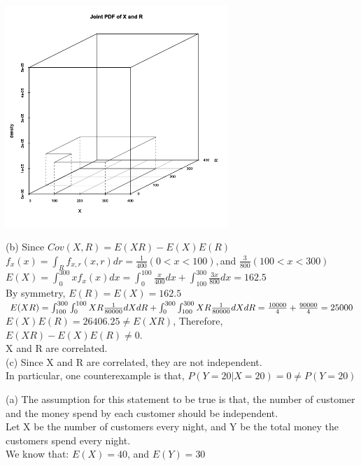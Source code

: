 \documentclass[11pt]{article}
\newenvironment{question}[2][Question]{\begin{trivlist}
\item[\hskip \labelsep {\bfseries #1}\hskip \labelsep {\bfseries #2.}]}{\end{trivlist}}
\begin{document}
 \begin{center}
 \includegraphics[height = 3.30in]{Q2_a}
 \end{center}
 
  (b) Since $Cov(X,R) = E(XR) - E(X)E(R)$\\
  $f_x(x) =\int_{R} f_{x,r}(x,r)dr = \frac{1}{400} (0<x<100), $and $  \frac{3}{800} (100<x<300)$\\
  $E(X) = \int_{0}^{300} xf_x(x)dx = \int_{0}^{100} \frac{x}{400}dx +\int_{100}^{300} \frac{3x}{800}dx = 162.5$\\
  By symmetry, $E(R) = E(X)  = 162.5$\\
  $E(XR) =\int_{100}^{300} \int_{0}^{100} XR  \frac{1}{80000}dXdR +\int_{0}^{300} \int_{100}^{300} XR  \frac{1}{80000}dXdR\\
   = \frac{10000}{4} + \frac{90000}{4} = 25000$\\
  $ E(X)E(R) =26406.25 \neq E(XR)$, Therefore, $E(XR) - E(X)E(R) \neq 0$.\\ X and R are correlated.\\
    
  
  (c) Since X and R are correlated, they are not independent. \\
  In particular, one counterexample is that, $P(Y = 20|X = 20) = 0 \neq P(Y = 20)$\\
  
  \begin{question}{3}
  	\end{question}
  (a) The assumption for this statement to be true is that, the number of customer and the money spend by each customer should be independent. \\
  Let X be the number of customers every night, and Y be the total money the customers spend every night. \\
  We know that: $E(X) = 40$, and $E(Y) = 30$\\
  
\end{document}
